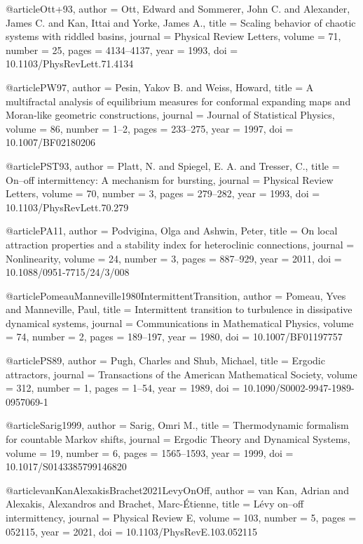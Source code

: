 @article{Ott+93,
  author  = {Ott, Edward and Sommerer, John C. and Alexander, James C. and Kan, Ittai and Yorke, James A.},
  title   = {Scaling behavior of chaotic systems with riddled basins},
  journal = {Physical Review Letters},
  volume  = {71},
  number  = {25},
  pages   = {4134--4137},
  year    = {1993},
  doi     = {10.1103/PhysRevLett.71.4134}
}

@article{PW97,
  author  = {Pesin, Yakov B. and Weiss, Howard},
  title   = {A multifractal analysis of equilibrium measures for conformal expanding maps and {Moran}-like geometric constructions},
  journal = {Journal of Statistical Physics},
  volume  = {86},
  number  = {1--2},
  pages   = {233--275},
  year    = {1997},
  doi     = {10.1007/BF02180206}
}

@article{PST93,
  author  = {Platt, N. and Spiegel, E. A. and Tresser, C.},
  title   = {On--off intermittency: A mechanism for bursting},
  journal = {Physical Review Letters},
  volume  = {70},
  number  = {3},
  pages   = {279--282},
  year    = {1993},
  doi     = {10.1103/PhysRevLett.70.279}
}

@article{PA11,
  author  = {Podvigina, Olga and Ashwin, Peter},
  title   = {On local attraction properties and a stability index for heteroclinic connections},
  journal = {Nonlinearity},
  volume  = {24},
  number  = {3},
  pages   = {887--929},
  year    = {2011},
  doi     = {10.1088/0951-7715/24/3/008}
}

@article{PomeauManneville1980IntermittentTransition,
  author  = {Pomeau, Yves and Manneville, Paul},
  title   = {Intermittent transition to turbulence in dissipative dynamical systems},
  journal = {Communications in Mathematical Physics},
  volume  = {74},
  number  = {2},
  pages   = {189--197},
  year    = {1980},
  doi     = {10.1007/BF01197757}
}

@article{PS89,
  author  = {Pugh, Charles and Shub, Michael},
  title   = {Ergodic attractors},
  journal = {Transactions of the American Mathematical Society},
  volume  = {312},
  number  = {1},
  pages   = {1--54},
  year    = {1989},
  doi     = {10.1090/S0002-9947-1989-0957069-1}
}

@article{Sarig1999,
  author  = {Sarig, Omri M.},
  title   = {Thermodynamic formalism for countable {Markov} shifts},
  journal = {Ergodic Theory and Dynamical Systems},
  volume  = {19},
  number  = {6},
  pages   = {1565--1593},
  year    = {1999},
  doi     = {10.1017/S0143385799146820}
}

@article{vanKanAlexakisBrachet2021LevyOnOff,
  author  = {van Kan, Adrian and Alexakis, Alexandros and Brachet, Marc-Étienne},
  title   = {L{\'e}vy on--off intermittency},
  journal = {Physical Review E},
  volume  = {103},
  number  = {5},
  pages   = {052115},
  year    = {2021},
  doi     = {10.1103/PhysRevE.103.052115}
}

